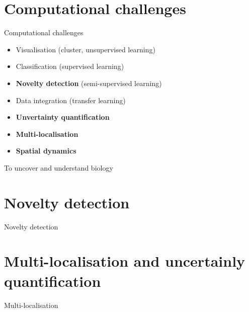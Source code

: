 \documentclass{beamer}
\theoremstyle{example}
\begin{document}

\section{Computational challenges}


\begin{frame}{Computational challenges}

  \begin{itemize}
  \item Visualisation (cluster, unsupervised learning)
  \item Classification (supervised learning)
  \item \textbf{Novelty detection} (semi-supervised learning)
  \item Data integration (transfer learning)
  \item \textbf{Unvertainty quantification}
  \item \textbf{Multi-localisation}
  \item \textbf{Spatial dynamics}
  \end{itemize}
  \centering

  \bigskip

  {\Large To uncover and understand biology}
\end{frame}



\section{Novelty detection}


\begin{frame}{Novelty detection}

\end{frame}



\section{Multi-localisation and uncertainly quantification}


\begin{frame}{Multi-localisation}

\end{frame}
\end{document}
